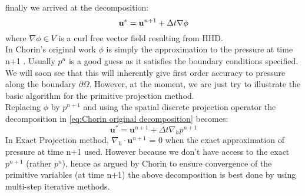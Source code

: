 finally we arrived at the decomposition:
\begin{equation}\label{eq:Chorin original decomposition}
\textbf{u}^* = \textbf{u}^{n+1} + \Delta t \nabla \textit{$\phi$} \\
\end{equation}
where $\nabla \phi \in \textit{V}$ is a curl free vector field resulting from HHD.\\

In Chorin's original work $\phi$ is simply the approximation to the pressure at time n+1 \cite{chorin1968numerical}. Usually $\textit{p}^n$ is a good guess as it satisfies the boundary conditions specified. We will soon see that this will inherently give first order accuracy to pressure along the boundary $\partial \Omega$. However, at the moment, we are just try to illustrate the basic algorithm for the primitive projection method.\\
Replacing $\phi$ by $\textit{p}^{n+1}$ and using the spatial discrete projection operator the decomposition in \eqref{eq:Chorin original decomposition} becomes:
\begin{equation}
\textbf{u}^* = \textbf{u}^{n+1} + \Delta t \nabla_h \textit{p}^{n+1}
\end{equation}
In Exact Projection method, $\nabla_h \cdot \textbf{u}^{n+1}$ = 0 when the exact approximation of pressure at time n+1 used. However because we don't have access to the exact $\textit{p}^{n+1}$ (rather $\textit{p}^n$), hence as argued by Chorin \cite{chorin1968numerical} to ensure convergence of the primitive variables (at time n+1) the above decomposition is best done by using multi-step iterative methods.\\

